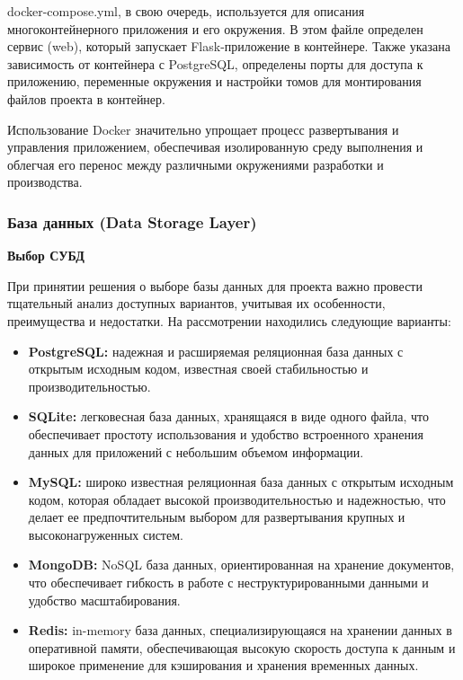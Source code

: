 \documentclass[12pt, russian]{extarticle}
\begin{document}
\begin{spacing}{1.5}
docker-compose.yml, в свою очередь, используется для описания многоконтейнерного приложения и его окружения. В этом файле определен сервис (web), который запускает Flask-приложение в контейнере. Также указана зависимость от контейнера с PostgreSQL, определены порты для доступа к приложению, переменные окружения и настройки томов для монтирования файлов проекта в контейнер.

Использование Docker значительно упрощает процесс развертывания и управления приложением, обеспечивая изолированную среду выполнения и облегчая его перенос между различными окружениями разработки и производства.
\subsubsection{База данных (Data Storage Layer)}

\par \noindent \textbf{Выбор СУБД}


При принятии решения о выборе базы данных для проекта важно провести тщательный анализ доступных вариантов, учитывая их особенности, преимущества и недостатки. На рассмотрении находились следующие варианты:


\begin{itemize}
    \item \textbf{PostgreSQL:} надежная и расширяемая реляционная база данных с открытым исходным кодом, известная своей стабильностью и производительностью.
    \item \textbf{SQLite:} легковесная база данных, хранящаяся в виде одного файла, что обеспечивает простоту использования и удобство встроенного хранения данных для приложений с небольшим объемом информации.
    \item \textbf{MySQL:} широко известная реляционная база данных с открытым исходным кодом, которая обладает высокой производительностью и надежностью, что делает ее предпочтительным выбором для развертывания крупных и высоконагруженных систем.
    \item \textbf{MongoDB:} NoSQL база данных, ориентированная на хранение документов, что обеспечивает гибкость в работе с неструктурированными данными и удобство масштабирования.
    \item \textbf{Redis:} in-memory база данных, специализирующаяся на хранении данных в оперативной памяти, обеспечивающая высокую скорость доступа к данным и широкое применение для кэширования и хранения временных данных.
\end{itemize}


\end{spacing}
\end{document}
